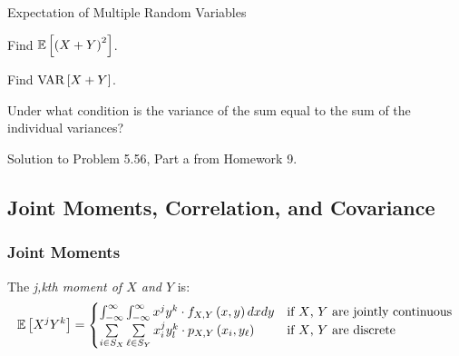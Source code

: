 		\begin{example}[Problem 5.56]{Expectation of Multiple Random Variables}
                  \begin{boldalphlist}
                  \item Find $\operatorname{\operatorname{\mathbb{E}}} \left[ \left( X+Y \right)^{2} \right]$.
                  \item Find $\operatorname{\operatorname{VAR}} \left[ X+Y \right]$.
                  \item Under what condition is the variance of the sum equal to the sum of the individual variances?
                  \end{boldalphlist}

                  \tcblower

                  Solution to Problem 5.56, Part a from Homework 9.
		\end{example}

	\subsection{Joint Moments, Correlation, and Covariance} \label{subsec:Joint Moments, Correlation, and Covariance}
		\subsubsection{Joint Moments} \label{subsubsec:Joint Moments}
			\begin{definition} \label{def:jkth Moment}
				The \emph{j,kth moment of $X$ and $Y$} is:
				\begin{equation} \label{eq:jkth Moment}
					\operatorname{\operatorname{\mathbb{E}}} \left[ X^{j} Y^{k} \right] =
					\begin{cases}
						\int_{-\infty}^{\infty} \int_{-\infty}^{\infty} x^{j} y^{k} \cdot f_{X,Y} \left( x,y \right) dx dy &
							\text{if $X$, $Y$ are jointly continuous} \\
						\sum\limits_{i \in S_{X}} \sum\limits_{\ell \in S_{Y}} x_{i}^{j} y_{l}^{k} \cdot p_{X,Y} \left( x_{i},y_{\ell} \right) &
							\text{if $X$, $Y$ are discrete} \\
					\end{cases}
				\end{equation}
			\end{definition}


